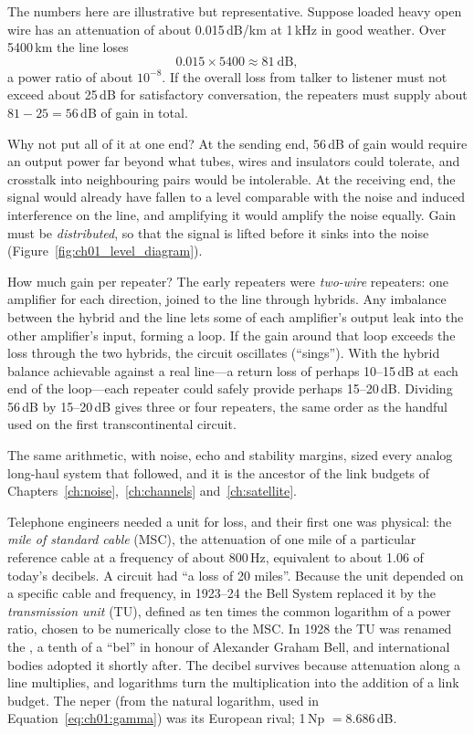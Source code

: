 \begin{worked}
The numbers here are illustrative but representative. Suppose loaded heavy open wire has an
attenuation of about 0.015\,dB/km at 1\,kHz in good weather. Over 5400\,km the line loses
\[
0.015\times5400 \approx 81\ \mathrm{dB},
\]
a power ratio of about $10^{-8}$. If the overall loss from talker to listener must not exceed about
25\,dB for satisfactory conversation, the repeaters must supply about $81-25=56$\,dB of gain in
total.

Why not put all of it at one end? At the sending end, 56\,dB of gain would require an output power
far beyond what tubes, wires and insulators could tolerate, and crosstalk into neighbouring pairs
would be intolerable. At the receiving end, the signal would already have fallen to a level
comparable with the noise and induced interference on the line, and amplifying it would amplify
the noise equally. Gain must be \emph{distributed}, so that the signal is lifted before it sinks
into the noise (Figure~\ref{fig:ch01_level_diagram}).

How much gain per repeater? The early repeaters were \emph{two-wire} repeaters: one amplifier
for each direction, joined to the line through hybrids. Any imbalance between the hybrid and the
line lets some of each amplifier's output leak into the other amplifier's input, forming a loop.
If the gain around that loop exceeds the loss through the two hybrids, the circuit oscillates
(``sings''). With the hybrid balance achievable against a real line---a return loss of perhaps
10--15\,dB at each end of the loop---each repeater could safely provide perhaps 15--20\,dB.
Dividing 56\,dB by 15--20\,dB gives three or four repeaters, the same order as the handful used
on the first transcontinental circuit.

The same arithmetic, with noise, echo and stability margins, sized every analog long-haul system
that followed, and it is the ancestor of the link budgets of
Chapters~\ref{ch:noise},~\ref{ch:channels} and~\ref{ch:satellite}.
\end{worked}

\begin{inpractice}
Telephone engineers needed a unit for loss, and their first one was physical: the \emph{mile of
standard cable} (MSC), the attenuation of one mile of a particular reference cable at a frequency
of about 800\,Hz, equivalent to about 1.06 of today's decibels. A circuit had ``a loss of 20 miles''.
Because the unit depended on a specific cable and frequency, in 1923--24 the Bell System replaced
it by the \emph{transmission unit} (TU), defined as ten times the common logarithm of a power ratio,
chosen to be numerically close to the MSC. In 1928 the TU was renamed the , a tenth of
a ``bel'' in honour of Alexander Graham Bell, and international bodies adopted it shortly after. The
decibel survives because attenuation along a line multiplies, and logarithms turn the
multiplication into the addition of a link budget. The neper (from the natural logarithm, used in
Equation~\eqref{eq:ch01:gamma}) was its European rival; 1\,Np $=8.686$\,dB.
\end{inpractice}

